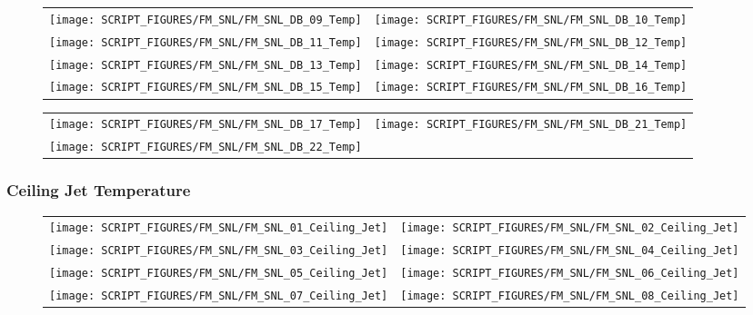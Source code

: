 \begin{figure}[!ht]
\begin{tabular*}{\textwidth}{l@{\extracolsep{\fill}}r}
\texttt{[image: SCRIPT\_FIGURES/FM\_SNL/FM\_SNL\_DB\_09\_Temp]} &
\texttt{[image: SCRIPT\_FIGURES/FM\_SNL/FM\_SNL\_DB\_10\_Temp]} \\
\texttt{[image: SCRIPT\_FIGURES/FM\_SNL/FM\_SNL\_DB\_11\_Temp]} &
\texttt{[image: SCRIPT\_FIGURES/FM\_SNL/FM\_SNL\_DB\_12\_Temp]} \\
\texttt{[image: SCRIPT\_FIGURES/FM\_SNL/FM\_SNL\_DB\_13\_Temp]} &
\texttt{[image: SCRIPT\_FIGURES/FM\_SNL/FM\_SNL\_DB\_14\_Temp]} \\
\texttt{[image: SCRIPT\_FIGURES/FM\_SNL/FM\_SNL\_DB\_15\_Temp]} &
\texttt{[image: SCRIPT\_FIGURES/FM\_SNL/FM\_SNL\_DB\_16\_Temp]}
\end{tabular*}
\end{figure}

\begin{figure}[!ht]
\begin{tabular*}{\textwidth}{l@{\extracolsep{\fill}}r}
\texttt{[image: SCRIPT\_FIGURES/FM\_SNL/FM\_SNL\_DB\_17\_Temp]} &
\texttt{[image: SCRIPT\_FIGURES/FM\_SNL/FM\_SNL\_DB\_21\_Temp]} \\
\texttt{[image: SCRIPT\_FIGURES/FM\_SNL/FM\_SNL\_DB\_22\_Temp]}
\end{tabular*}
\end{figure}

\clearpage

\subsubsection{Ceiling Jet Temperature}

\begin{figure}[!ht]
\begin{tabular*}{\textwidth}{l@{\extracolsep{\fill}}r}
\texttt{[image: SCRIPT\_FIGURES/FM\_SNL/FM\_SNL\_01\_Ceiling\_Jet]} &
\texttt{[image: SCRIPT\_FIGURES/FM\_SNL/FM\_SNL\_02\_Ceiling\_Jet]} \\
\texttt{[image: SCRIPT\_FIGURES/FM\_SNL/FM\_SNL\_03\_Ceiling\_Jet]} &
\texttt{[image: SCRIPT\_FIGURES/FM\_SNL/FM\_SNL\_04\_Ceiling\_Jet]} \\
\texttt{[image: SCRIPT\_FIGURES/FM\_SNL/FM\_SNL\_05\_Ceiling\_Jet]} &
\texttt{[image: SCRIPT\_FIGURES/FM\_SNL/FM\_SNL\_06\_Ceiling\_Jet]} \\
\texttt{[image: SCRIPT\_FIGURES/FM\_SNL/FM\_SNL\_07\_Ceiling\_Jet]} &
\texttt{[image: SCRIPT\_FIGURES/FM\_SNL/FM\_SNL\_08\_Ceiling\_Jet]}
\end{tabular*}
\end{figure}

